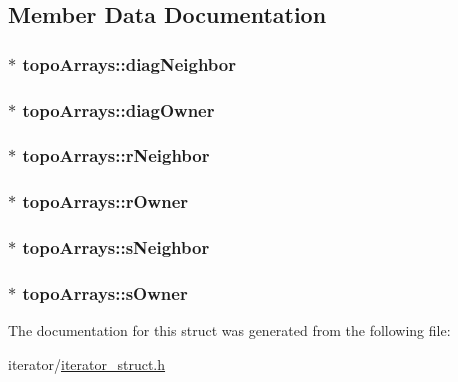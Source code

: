 \subsection{Member Data Documentation}
\hypertarget{structtopoArrays_a733608e9e5b25298161b3e088ee25bcb}{
\subsubsection[{diagNeighbor}]{$\ast$ {\bf topoArrays::diagNeighbor}}}
\label{structtopoArrays_a733608e9e5b25298161b3e088ee25bcb}
\hypertarget{structtopoArrays_a16a09e43e4a177ae1ce6d62327186ddd}{
\subsubsection[{diagOwner}]{$\ast$ {\bf topoArrays::diagOwner}}}
\label{structtopoArrays_a16a09e43e4a177ae1ce6d62327186ddd}
\hypertarget{structtopoArrays_a010f7191ca0f319e5e16daf50cc9b0e2}{
\subsubsection[{rNeighbor}]{$\ast$ {\bf topoArrays::rNeighbor}}}
\label{structtopoArrays_a010f7191ca0f319e5e16daf50cc9b0e2}
\hypertarget{structtopoArrays_a67f0893bcaaccfed33e94814a4ccabde}{
\subsubsection[{rOwner}]{$\ast$ {\bf topoArrays::rOwner}}}
\label{structtopoArrays_a67f0893bcaaccfed33e94814a4ccabde}
\hypertarget{structtopoArrays_a94d583a57fddecfe783b02cf4d2bcd1e}{
\subsubsection[{sNeighbor}]{$\ast$ {\bf topoArrays::sNeighbor}}}
\label{structtopoArrays_a94d583a57fddecfe783b02cf4d2bcd1e}
\hypertarget{structtopoArrays_a121406d935900f19c089bd8168a803f7}{
\subsubsection[{sOwner}]{$\ast$ {\bf topoArrays::sOwner}}}
\label{structtopoArrays_a121406d935900f19c089bd8168a803f7}


The documentation for this struct was generated from the following file:\begin{DoxyCompactItemize}
\item 
iterator/\hyperlink{iterator__struct_8h}{iterator\_\-struct.h}\end{DoxyCompactItemize}
